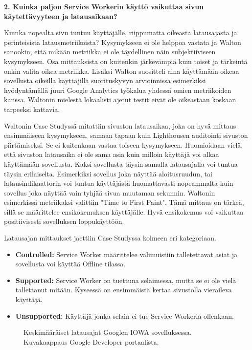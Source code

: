 \documentclass{tktltiki}
\begin{document}
\textbf{2. Kuinka paljon Service Workerin käyttö vaikuttaa sivun käytettävyyteen ja latausaikaan?}

Kuinka nopealta sivu tuntuu käyttäjälle, riippumatta oikeasta latausajasta ja perinteisistä latausmetriikoista? Kysymykseen ei ole helppoa vastata ja Walton sanookin, että mikään metriikka ei ole täydellinen näin subjektiiviseen kysymykseen. Osa mittauksista on kuitenkin järkevämpiä kuin toiset ja tärkeintä onkin valita oikea metriikka. Lisäksi Walton suositteli aina käyttämään oikeaa sovellusta oikeilla käyttäjillä suorituskyvyn arvioinnissa esimerkiksi hyödyntämällä juuri Google Analytics työkalua yhdessä omien metriikoiden kanssa. Waltonin mielestä lokaalisti ajetut testit eivät ole oikeastaan koskaan tarpeeksi kattavia.

Waltonin Case Studyssä mitattiin sivuston latausaikaa, joka on hyvä mittaus ensimmäiseen kysymykseen, samaan tapaan kuin Lighthousen auditointi sivuston piirtämiseksi. Se ei kuitenkaan vastaa toiseen kysymykseen. Huomioidaan vielä, että sivuston latausaika ei ole sama asia kuin milloin käyttäjä voi alkaa käyttämään sovellusta. Kaksi sovellusta täysin samalla latausajalla voi tuntua täysin erilaiselta. Esimerkiksi sovellus joka näyttää aloitusruudun, tai latausindikaattorin voi tuntua käyttäjästä huomattavasti nopeammalta kuin sovellus joka näyttää vain tyhjää sivua muutaman sekunnin. Waltonin esimerkissä metriikaksi valittiin "Time to First Paint". Tämä mittaus on tärkeä, sillä se määrittelee ensikokemuksen käyttäjälle. Hyvä ensikokemus voi vaikuttaa positiivisesti sovelluksen loppukäyttöön. 

Latausajan mittaukset jaettiin Case Studyssa kolmeen eri kategoriaan.

\begin{itemize}
  \item \textbf{Controlled:} Service Worker määrittelee välimuistiin talletettavat asiat ja sovellusta voi käyttää Offline tilassa.
  \item \textbf{Supported:} Service Worker on tuettuna selaimessa, mutta se ei ole vielä tallettanut mitään. Kyseessä on ensimmäistä kertaa sivustolla vieraileva käyttäjä.
  \item \textbf{Unsupported:} Käyttäjä jonka selain ei tue Service Workeria ollenkaan. 
\end{itemize}

\begin{figure}[h]
\begin{center}
\caption{Keskimääräiset latausajat Googlen IOWA sovelluksessa. Kuvakaappaus Google Developer portaalista.}
\label{Google AVG load times}
\end{center}
\end{figure}
\end{document}
